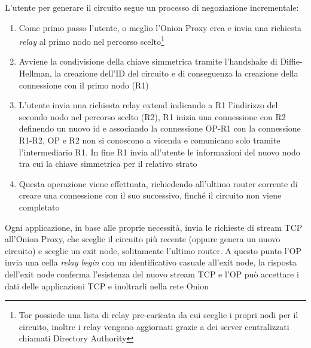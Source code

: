 L'utente per generare il circuito segue un processo di negoziazione incrementale:
\begin{enumerate}
    \item Come primo passo l'utente, o meglio l'Onion Proxy crea e invia una richiesta \emph{relay} al primo nodo nel percorso scelto\footnote{Tor possiede una lista di relay pre-caricata da cui sceglie i propri nodi per il circuito, inoltre i relay vengono aggiornati grazie a dei server centralizzati chiamati Directory Authority}
    \item Avviene la condivisione della chiave simmetrica tramite l'handshake di Diffie-Hellman, la creazione dell'ID del circuito e di conseguenza la creazione della connessione con il primo nodo (R1)
    \item L'utente invia una richiesta relay extend indicando a R1 l'indirizzo del secondo nodo nel percorso scelto (R2), R1 inizia una connessione con R2 definendo un nuovo id e associando la connessione OP-R1 con la connessione R1-R2, OP e R2 non si conoscono a vicenda e comunicano solo tramite l'intermediario R1. In fine R1 invia all'utente le informazioni del nuovo nodo tra cui la chiave simmetrica per il relativo strato
    \item Questa operazione viene effettuata, richiedendo all'ultimo router corrente di creare una connessione con il suo successivo, finché il circuito non viene completato\cite{ChaumMixes}
\end{enumerate}
Ogni applicazione, in base alle proprie necessità, invia le richieste di stream TCP all'Onion Proxy, che sceglie il circuito più recente (oppure genera un nuovo circuito) e sceglie un exit node, solitamente l'ultimo router. 
A questo punto l'OP invia una cella \emph{relay begin} con un identificativo casuale all'exit node, la risposta dell'exit node conferma l'esistenza del nuovo stream TCP e l'OP può accettare i dati delle applicazioni TCP e inoltrarli nella rete Onion \\


